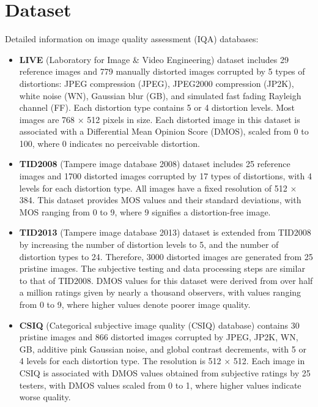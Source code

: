 \section{Dataset}
\label{sec:Dataset}
Detailed information on image quality assessment (IQA) databases: \par
\begin{itemize}
    \item \textbf{LIVE} (Laboratory for Image \& Video Engineering) dataset \autocite{LIVE} includes 29 reference images and 779 manually distorted images corrupted by 5 types of distortions: JPEG compression (JPEG), JPEG2000 compression (JP2K), white noise (WN), Gaussian blur (GB), and simulated fast fading Rayleigh channel (FF). Each distortion type contains 5 or 4 distortion levels. Most images are 768 $\times$ 512 pixels in size. Each distorted image in this dataset is associated with a Differential Mean Opinion Score (DMOS), scaled from 0 to 100, where 0 indicates no perceivable distortion. 
    \item \textbf{TID2008} (Tampere image database 2008) dataset \autocite{TID2008} includes 25 reference images and 1700 distorted images corrupted by 17 types of distortions, with 4 levels for each distortion type. All images have a fixed resolution of 512 $\times$ 384. This dataset provides MOS values and their standard deviations, with MOS ranging from 0 to 9, where 9 signifies a distortion-free image.
    \item \textbf{TID2013} (Tampere image database 2013) dataset \autocite{TID2013} is extended from TID2008 \autocite{TID2008} by increasing the number of distortion levels to 5, and the number of distortion types to 24. Therefore, 3000 distorted images are generated from 25 pristine images. The subjective testing and data processing steps are similar to that of TID2008. DMOS values for this dataset were derived from over half a million ratings given by nearly a thousand observers, with values ranging from 0 to 9, where higher values denote poorer image quality.
    \item \textbf{CSIQ} (Categorical subjective image quality (CSIQ) database) \autocite{CSIQ} contains 30 pristine images and 866 distorted images corrupted by JPEG, JP2K, WN, GB, additive pink Gaussian noise, and global contrast decrements, with 5 or 4 levels for each distortion type. The resolution is 512 $\times$ 512. Each image in CSIQ is associated with DMOS values obtained from subjective ratings by 25 testers, with DMOS values scaled from 0 to 1, where higher values indicate worse quality.

\end{itemize}
